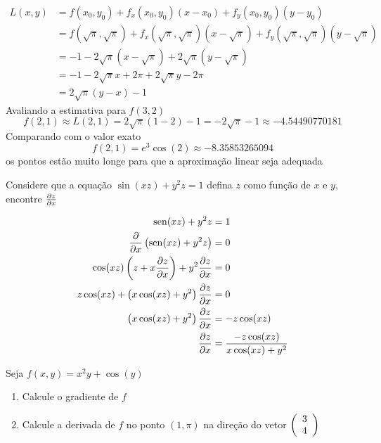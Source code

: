 \documentclass[a4paper,12pt,fleqn]{article}
\begin{document}
\begin{answer}
\begin{align*}
    L(x, y)
      & = f(x_0, y_0) + f_x(x_0, y_0)(x-x_0) + f_y(x_0, y_0)(y-y_0) \\
      & = f\left(\sqrt{\pi}, \sqrt{\pi}\right)
        + f_x\left(\sqrt{\pi}, \sqrt{\pi}\right)\left(x-\sqrt{\pi}\right)
        + f_y\left(\sqrt{\pi}, \sqrt{\pi}\right)\left(y-\sqrt{\pi}\right) \\
      & = -1
        - 2\sqrt{\pi}\left(x-\sqrt{\pi}\right)
        + 2\sqrt{\pi}\left(y-\sqrt{\pi}\right)  \\
      & = -1 - 2\sqrt{\pi}x + 2\pi + 2\sqrt{\pi}y - 2\pi \\
      & = 2\sqrt{\pi}(y-x) -1
  \end{align*}
  Avaliando a estimativa para \(f(3, 2)\)
  \[
    f(2, 1) \approx L(2, 1)
            = 2\sqrt{\pi}(1-2) -1
            = -2\sqrt{\pi} -1
            \approx -4.54490770181
  \]
  Comparando com o valor exato
  \[
    f(2, 1)
    = e^3\cos(2)
    \approx -8.35853265094
  \]
  os pontos estão muito longe para que a aproximação linear seja adequada
\end{answer}

Considere que a equação
\(
  \sin(xz) + y^2 z = 1
\)
defina $z$ como função de $x$ e $y$, encontre \(\frac{\partial {z}}{\partial {x}}\)
\clearpagequestiononly

\begin{answer}
  \begin{align*}
    \operatorname{sen}(xz) + y^2 z                                   & = 1                                    \\
    \frac{\partial {}}{\partial {x}}\left(\operatorname{sen}(xz) + y^2 z\right)               & = 0                                    \\
    \cos(xz)\left(z + x \frac{\partial {z}}{\partial {x}}\right) + y^2 \frac{\partial {z}}{\partial {x}} & = 0                                    \\
    z\cos(xz) + \left(x\cos(xz) + y^2\right) \frac{\partial {z}}{\partial {x}}  & = 0                                    \\
    \left( x \cos(xz) + y^2 \right) \frac{\partial {z}}{\partial {x}}           & = -z \cos(xz)                          \\
    \frac{\partial {z}}{\partial {x}}                                           & = \frac{-z \cos(xz)}{x \cos(xz) + y^2}
  \end{align*}
\end{answer}

Seja \( f(x, y) = x^2 y + \cos(y) \)
\begin{enumerate}[label=\alph*)]
  \item Calcule o gradiente de $f$
  \item Calcule a derivada de $f$ no ponto $(1, \pi)$ na direção do vetor $\left(\begin{array}{c} 3 \\ 4 \end{array}\right)$
\end{enumerate}
\clearpagequestiononly
\end{document}
